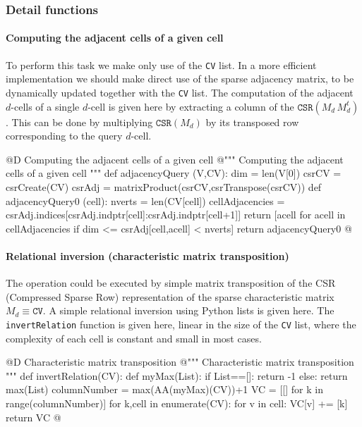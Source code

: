 \documentclass[11pt,oneside]{article}	%
\begin{document}
\subsubsection{Detail functions}


\paragraph{Computing the adjacent cells of a given cell}
To perform this task we make only use of the \texttt{CV} list. In a more efficient implementation we should make direct use of the sparse adjacency matrix, to be dynamically updated together with the \texttt{CV} list.
The computation of the adjacent $d$-cells of a single $d$-cell is given here by extracting a column of the $\texttt{CSR}(M_d\, M_d^t)$. This can be done by multiplying $\texttt{CSR}(M_d)$ by its transposed row corresponding to the query $d$-cell. 

@D Computing the adjacent cells of a given cell
@{""" Computing the adjacent cells of a given cell """
def adjacencyQuery (V,CV):
	dim = len(V[0])
	csrCV =  csrCreate(CV)
	csrAdj = matrixProduct(csrCV,csrTranspose(csrCV))
	def adjacencyQuery0 (cell):
		nverts = len(CV[cell])
		cellAdjacencies = csrAdj.indices[csrAdj.indptr[cell]:csrAdj.indptr[cell+1]]
		return [acell for acell in cellAdjacencies if dim <= csrAdj[cell,acell] < nverts]
	return adjacencyQuery0
@}


\paragraph{Relational inversion (characteristic matrix transposition)}

The operation could be executed by simple matrix transposition of the CSR (Compressed Sparse Row) representation of the sparse characteristic matrix $M_d \equiv \texttt{CV}$.
A simple relational inversion using Python lists is given here. The \texttt{invertRelation} function 
is given here, linear in the size of the \texttt{CV} list, where the complexity of each cell is constant and 
small in most cases.

@D Characteristic matrix transposition
@{""" Characteristic matrix transposition """
def invertRelation(CV):
	def myMax(List):
		if List==[]: return -1
		else: return max(List)
	columnNumber = max(AA(myMax)(CV))+1
	VC = [[] for k in range(columnNumber)]
	for k,cell in enumerate(CV):
		for v in cell:
			VC[v] += [k]
	return VC
@}
\end{document}
